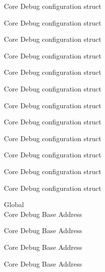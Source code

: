 \begin{DoxyRefList}
\label{deprecated__deprecated000372}%
%
Core Debug configuration struct 

\label{deprecated__deprecated000448}%
%
Core Debug configuration struct 

\label{deprecated__deprecated000551}%
%
Core Debug configuration struct 

\label{deprecated__deprecated000653}%
%
Core Debug configuration struct 

\label{deprecated__deprecated000778}%
%
Core Debug configuration struct 

\label{deprecated__deprecated000832}%
%
Core Debug configuration struct 

\label{deprecated__deprecated000908}%
%
Core Debug configuration struct 

\label{deprecated__deprecated000971}%
%
Core Debug configuration struct 

\label{deprecated__deprecated001050}%
%
Core Debug configuration struct 

\label{deprecated__deprecated001126}%
%
Core Debug configuration struct 

\label{deprecated__deprecated001229}%
%
Core Debug configuration struct 

\label{deprecated__deprecated001331}%
%
Core Debug configuration struct  
\item[Global \doxylink{group___c_m_s_i_s___core_debug_ga680604dbcda9e9b31a1639fcffe5230b}{Core\+Debug\+\_\+\+BASE} ]\hfill \\
\label{deprecated__deprecated000099}%
%
Core Debug Base Address 

\label{deprecated__deprecated000153}%
%
Core Debug Base Address 

\label{deprecated__deprecated000229}%
%
Core Debug Base Address 

\label{deprecated__deprecated000292}%
%
Core Debug Base Address 


\end{DoxyRefList}
